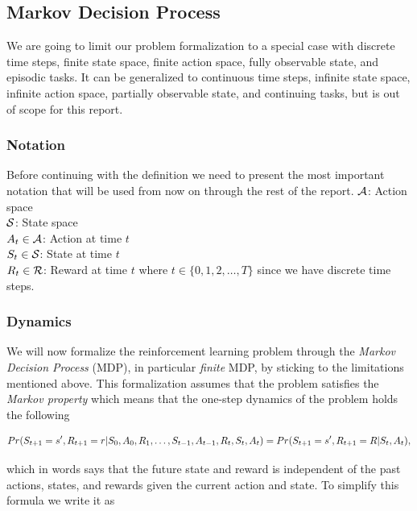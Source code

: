 \documentclass[result.tex]{subfiles}
\begin{document}
    \subsection*{Markov Decision Process}

    We are going to limit our problem formalization to a special case with discrete time steps, finite state space, finite action space, fully observable state, and episodic tasks. It can be generalized to continuous time steps, infinite state space, infinite action space, partially observable state, and continuing tasks, but is out of scope for this report.

    \subsubsection*{Notation}

    Before continuing with the definition we need to present the most important notation that will be used from now on through the rest of the report.
    \newline
    $\mathcal{A}$: Action space \\
    $\mathcal{S}$: State space \\
    $A_t \in \mathcal{A}$: Action at time $t$ \\
    $S_t \in \mathcal{S}$: State at time $t$ \\
    $R_t \in \mathcal{R}$: Reward at time $t$
    \newline
    where $t \in \{ 0, 1, 2, \ldots, T \}$ since we have discrete time steps.

    \subsubsection*{Dynamics}

    We will now formalize the reinforcement learning problem through the \textit{Markov Decision Process} (MDP), in particular \textit{finite} MDP, by sticking to the limitations mentioned above. This formalization assumes that the problem satisfies the \textit{Markov property} which means that the one-step dynamics of the problem holds the following

    \begin{align*}
        Pr(S_{t + 1} = s^\prime, R_{t + 1} = r | S_0, A_0, R_1, \ldots, S_{t - 1}, A_{t - 1}, R_t, S_t, A_t) = Pr(S_{t + 1} = s^\prime, R_{t + 1} = R | S_t, A_t),
    \end{align*}

    which in words says that the future state and reward is independent of the past actions, states, and rewards given the current action and state. To simplify this formula we write it as
\end{document}
